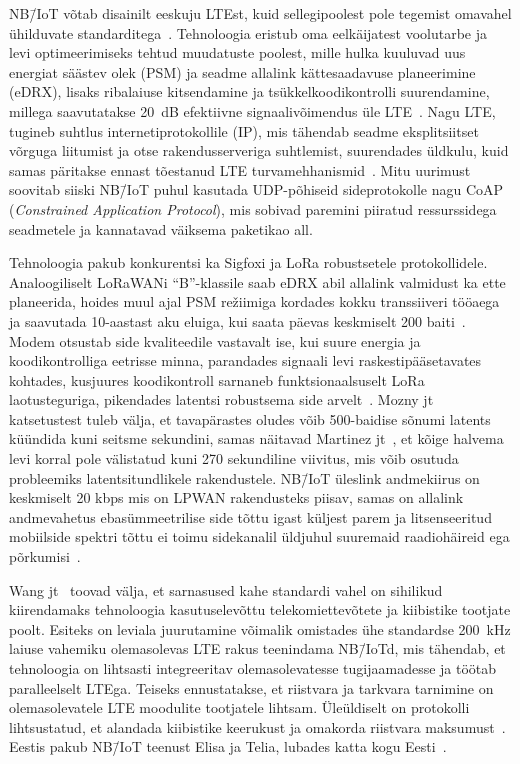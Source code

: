 \documentclass[12pt]{article}
\begin{document}
    NB\=/IoT võtab disainilt eeskuju LTEst, kuid sellegipoolest pole tegemist omavahel ühilduvate standarditega~\cite{wanglin}.
    Tehnoloogia eristub oma eelkäijatest voolutarbe ja levi optimeerimiseks tehtud muudatuste poolest, mille hulka kuuluvad uus energiat säästev olek (PSM) ja seadme allalink kättesaadavuse planeerimine (eDRX), lisaks ribalaiuse kitsendamine ja tsükkelkoodikontrolli suurendamine, millega saavutatakse \SI{20}{\deci\bel} efektiivne signaalivõimendus üle LTE~\cite{xuyao}.
    Nagu LTE, tugineb suhtlus internetiprotokollile (IP), mis tähendab seadme eksplitsiitset võrguga liitumist ja otse rakendusserveriga suhtlemist, suurendades üldkulu, kuid samas päritakse ennast tõestanud LTE turvamehhanismid~\cite{basu}.
    Mitu uurimust~\cite{wirges, larmo} soovitab siiski NB\=/IoT puhul kasutada UDP-põhiseid sideprotokolle nagu CoAP (\textit{Constrained Application Protocol}), mis sobivad paremini piiratud ressurssidega seadmetele ja kannatavad väiksema paketikao all.

    Tehnoloogia pakub konkurentsi ka Sigfoxi ja LoRa robustsetele protokollidele.
    Analoogiliselt LoRaWANi "`B"'-klassile saab eDRX abil allalink valmidust ka ette planeerida, hoides muul ajal PSM režiimiga kordades kokku transsiiveri tööaega ja saavutada 10-aastast aku eluiga, kui saata päevas keskmiselt 200 baiti~\cite{wanglin}.
    Modem otsustab side kvaliteedile vastavalt ise, kui suure energia ja koodikontrolliga eetrisse minna, parandades signaali levi raskestipääsetavates kohtades, kusjuures koodikontroll sarnaneb funktsionaalsuselt LoRa laotusteguriga, pikendades latentsi robustsema side arvelt~\cite{martinez}.
    Mozny jt~\cite{mozny} katsetustest tuleb välja, et tavapärastes oludes võib 500-baidise sõnumi latents küündida kuni seitsme sekundini, samas näitavad Martinez jt~\cite{martinez}, et kõige halvema levi korral pole välistatud kuni 270 sekundiline viivitus, mis võib osutuda probleemiks latentsitundlikele rakendustele.
    NB\=/IoT üleslink andmekiirus on keskmiselt 20 kbps mis on LPWAN rakendusteks piisav, samas on allalink andmevahetus ebasümmeetrilise side tõttu igast küljest parem ja litsenseeritud mobiilside spektri tõttu ei toimu sidekanalil üldjuhul suuremaid raadiohäireid ega põrkumisi~\cite{wanglin}.

    Wang jt~\cite{wanglin} toovad välja, et sarnasused kahe standardi vahel on sihilikud kiirendamaks tehnoloogia kasutuselevõttu telekomiettevõtete ja kiibistike tootjate poolt.
    Esiteks on leviala juurutamine võimalik omistades ühe standardse \SI{200}{\kilo\hertz} laiuse vahemiku olemasolevas LTE rakus teenindama NB\=/IoTd, mis tähendab, et tehnoloogia on lihtsasti integreeritav olemasolevatesse tugijaamadesse ja töötab paralleelselt LTEga.
    Teiseks ennustatakse, et riistvara ja tarkvara tarnimine on olemasolevatele LTE moodulite tootjatele lihtsam.
    Üleüldiselt on protokolli lihtsustatud, et alandada kiibistike keerukust ja omakorda riistvara maksumust~\cite{xuyao}.
    Eestis pakub NB\=/IoT teenust Elisa ja Telia, lubades katta kogu Eesti~\cite{nbtelia}.
\end{document}
